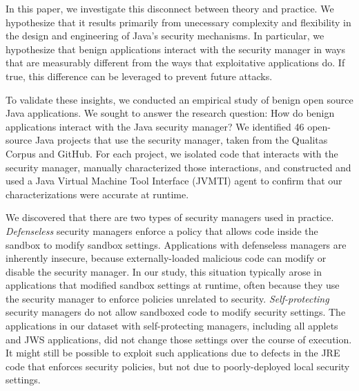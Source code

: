 \documentclass{sig-alternate}
\begin{document}
In this paper, we investigate this disconnect between theory and practice.  We
hypothesize that it results primarily from unecessary complexity and flexibility
in the design and engineering of Java's security mechanisms.   In particular, we
hypothesize that benign applications interact with the security manager in ways
that are measurably different from the ways that exploitative applications do.  
If true, this difference can be leveraged to prevent future attacks.

To validate these insights, we conducted an empirical study of benign open
source Java applications.  We sought to answer the research question: How do benign
applications interact with the Java security manager?  We identified 46
open-source Java projects that use the security manager, taken from the Qualitas
Corpus \cite{QualitasCorpus:APSEC:2010} and GitHub. For each project, we
isolated code that interacts with the security manager, manually characterized
those interactions, and constructed and used a Java Virtual Machine Tool Interface (JVMTI) agent
to confirm that our characterizations were accurate at runtime.

We discovered that there are two types of security managers used in
practice. \emph{Defenseless} security managers enforce a policy that allows code
inside the sandbox to modify sandbox settings.  Applications with defenseless
managers are inherently insecure, because externally-loaded malicious code can
modify or disable the security manager.  In our study, this situation typically
arose in applications that modified sandbox settings at runtime, often because
they use the security manager to enforce policies unrelated to security.
\emph{Self-protecting} security managers do not allow sandboxed code to modify
security settings.  The applications in our dataset with self-protecting
managers, including all applets and JWS applications, did not change those
settings over the course of execution.  It might still be possible to exploit
such applications due to defects in the JRE code that enforces security
policies, but not due to poorly-deployed local security settings.
\end{document}
